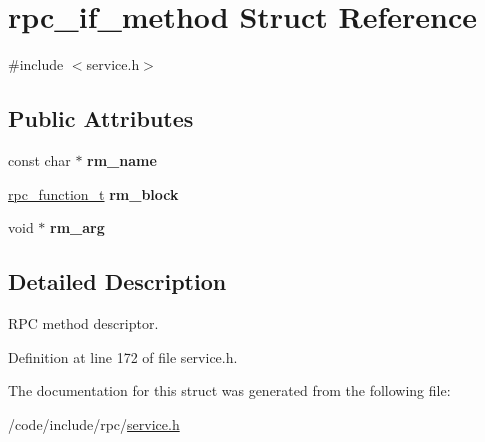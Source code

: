 \hypertarget{structrpc__if__method}{}\section{rpc\+\_\+if\+\_\+method Struct Reference}
\label{structrpc__if__method}


{\ttfamily \#include $<$service.\+h$>$}

\subsection*{Public Attributes}
\begin{DoxyCompactItemize}
\item 
const char $\ast$ {\bfseries rm\+\_\+name}\hypertarget{structrpc__if__method_a207409b75ef6c2cee361fb2ba4421c97}{}\label{structrpc__if__method_a207409b75ef6c2cee361fb2ba4421c97}

\item 
\hyperlink{service_8h_a02d3dbd723de9bd5140887c9935ff05a}{rpc\+\_\+function\+\_\+t} {\bfseries rm\+\_\+block}\hypertarget{structrpc__if__method_ad02bcfe0adc134947ab369c927e307a0}{}\label{structrpc__if__method_ad02bcfe0adc134947ab369c927e307a0}

\item 
void $\ast$ {\bfseries rm\+\_\+arg}\hypertarget{structrpc__if__method_a30f477ae1a1636164e2cc5051deb4fa1}{}\label{structrpc__if__method_a30f477ae1a1636164e2cc5051deb4fa1}

\end{DoxyCompactItemize}


\subsection{Detailed Description}
R\+PC method descriptor. 

Definition at line 172 of file service.\+h.



The documentation for this struct was generated from the following file\+:\begin{DoxyCompactItemize}
\item 
/code/include/rpc/\hyperlink{service_8h}{service.\+h}\end{DoxyCompactItemize}
